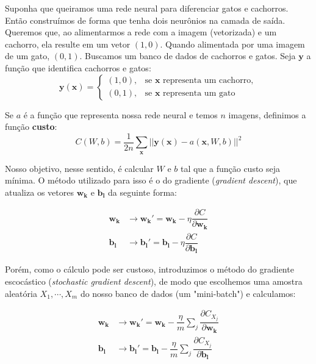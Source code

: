 \documentclass{article}
\begin{document}
            Suponha que queiramos uma rede neural para diferenciar gatos e cachorros.
            Então construímos de forma que tenha dois neurônios na camada de saída.
            Queremos que, ao alimentarmos a rede com a imagem (vetorizada) e um cachorro, ela resulte em um vetor $(1, 0)$.
            Quando alimentada por uma imagem de um gato, $(0, 1)$.
            Buscamos um banco de dados de cachorros e gatos. Seja $\mathbf{y}$ a função que identifica cachorros e gatos:
            $$\mathbf{y}(\mathbf{x}) =  \begin{cases}
                                            (1, 0), & \textrm{se } \mathbf{x} \textrm{ representa um cachorro}, \\
                                            (0, 1), & \textrm{se } \mathbf{x} \textrm{ representa um gato}
                                        \end{cases}$$

            Se $a$ é a função que representa nossa rede neural e temos $n$ imagens, definimos a função \textbf{custo}: $$C(W, b) = \dfrac{1}{2n} \sum_{\mathbf{x}} ||\mathbf{y}(\mathbf{x}) - a(\mathbf{x}, W, b)||^2$$

            Nosso objetivo, nesse sentido, é calcular $W$ e $b$ tal que a função custo seja mínima.
            O método utilizado para isso é o do gradiente (\textit{gradient descent}), que atualiza os vetores $\mathbf{w_k}$ e $\mathbf{b_l}$ da seguinte forma:

            \begin{equation}
                \begin{split}
                    \mathbf{w_k} &\rightarrow \mathbf{w_k'} = \mathbf{w_k} - \eta \dfrac{\partial C}{\partial \mathbf{w_k}} \\
                    \mathbf{b_l} &\rightarrow \mathbf{b_l'} = \mathbf{b_l} - \eta \dfrac{\partial C}{\partial \mathbf{b_l}}
                \end{split}
            \end{equation}

            Porém, como o cálculo pode ser custoso, introduzimos o método do gradiente escocástico (\textit{stochastic gradient descent}), de modo que escolhemos uma amostra aleatória $X_1, \cdots, X_m$ do nosso banco de dados (um "mini-batch") e calculamos:

            \begin{equation}
                \begin{split}
                    \mathbf{w_k} &\rightarrow \mathbf{w_k'} = \mathbf{w_k} - \dfrac{\eta}{m} \sum_j \dfrac{\partial C_{X_j}}{\partial \mathbf{w_k}} \\
                    \mathbf{b_l} &\rightarrow \mathbf{b_l'} = \mathbf{b_l} - \dfrac{\eta}{m} \sum_j \dfrac{\partial C_{X_j}}{\partial \mathbf{b_l}}
                \end{split}
            \end{equation}
\end{document}
